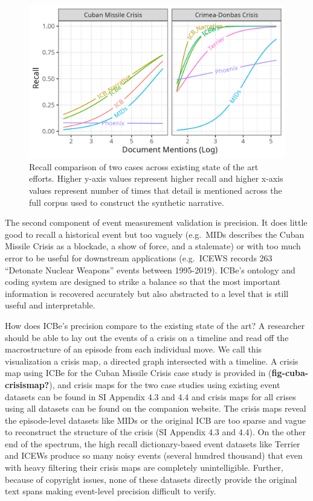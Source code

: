 \documentclass{article}
\begin{document}
\begin{figure}
\hypertarget{fig-recall-cases}{%
\centering
\includegraphics{p_recall.png}
\caption{Recall comparison of two cases across existing state of the art
efforts. Higher y-axis values represent higher recall and higher x-axis
values represent number of times that detail is mentioned across the
full corpus used to construct the synthetic
narrative.}\label{fig-recall-cases}
}
\end{figure}

The second component of event measurement validation is precision. It
does little good to recall a historical event but too vaguely (e.g.~MIDs
describes the Cuban Missile Crisis as a blockade, a show of force, and a
stalemate) or with too much error to be useful for downstream
applications (e.g.~ICEWS records 263 ``Detonate Nuclear Weapons'' events
between 1995-2019). ICBe's ontology and coding system are designed to
strike a balance so that the most important information is recovered
accurately but also abstracted to a level that is still useful and
interpretable.

How does ICBe's precision compare to the existing state of the art? A
researcher should be able to lay out the events of a crisis on a
timeline and read off the macrostructure of an episode from each
individual move. We call this visualization a crisis map, a directed
graph intersected with a timeline. A crisis map using ICBe for the Cuban
Missile Crisis case study is provided in (\textbf{fig-cuba-crisismap?}),
and crisis maps for the two case studies using existing event datasets
can be found in SI Appendix 4.3 and 4.4 and crisis maps for all crises
using all datasets can be found on the companion website. The crisis
maps reveal the episode-level datasets like MIDs or the original ICB are
too sparse and vague to reconstruct the structure of the crisis (SI
Appendix 4.3 and 4.4). On the other end of the spectrum, the high recall
dictionary-based event datasets like Terrier and ICEWs produce so many
noisy events (several hundred thousand) that even with heavy filtering
their crisis maps are completely unintelligible. Further, because of
copyright issues, none of these datasets directly provide the original
text spans making event-level precision difficult to verify.
\end{document}

